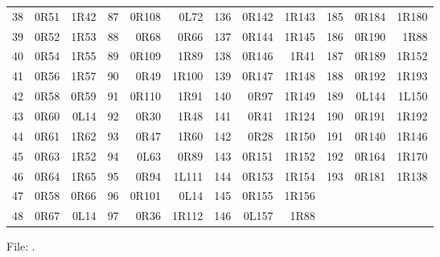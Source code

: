 \begin{center}
\begin{tabular}{rrr@{\hspace{7mm}}rrr@{\hspace{7mm}}rrr@{\hspace{7mm}}rrr}
38 & 0R51 & 1R42 & 87 & 0R108 & 0L72 & 136 & 0R142 & 1R143 & 185 & 0R184 & 1R180 \\
39 & 0R52 & 1R53 & 88 & 0R68 & 0R66 & 137 & 0R144 & 1R145 & 186 & 0R190 & 1R88 \\
40 & 0R54 & 1R55 & 89 & 0R109 & 1R89 & 138 & 0R146 & 1R41 & 187 & 0R189 & 1R152 \\
41 & 0R56 & 1R57 & 90 & 0R49 & 1R100 & 139 & 0R147 & 1R148 & 188 & 0R192 & 1R193 \\
42 & 0R58 & 0R59 & 91 & 0R110 & 1R91 & 140 & 0R97 & 1R149 & 189 & 0L144 & 1L150 \\
43 & 0R60 & 0L14 & 92 & 0R30 & 1R48 & 141 & 0R41 & 1R124 & 190 & 0R191 & 1R192 \\
44 & 0R61 & 1R62 & 93 & 0R47 & 1R60 & 142 & 0R28 & 1R150 & 191 & 0R140 & 1R146 \\
45 & 0R63 & 1R52 & 94 & 0L63 & 0R89 & 143 & 0R151 & 1R152 & 192 & 0R164 & 1R170 \\
46 & 0R64 & 1R65 & 95 & 0R94 & 1L111 & 144 & 0R153 & 1R154 & 193 & 0R181 & 1R138 \\
47 & 0R58 & 0R66 & 96 & 0R101 & 0L14 & 145 & 0R155 & 1R156 &  &  &  \\
48 & 0R67 & 0L14 & 97 & 0R36 & 1R112 & 146 & 0L157 & 1R88 &  &  &  \\
\bottomrule
\end{tabular}
\end{center}
\endgroup
\noindent File: .
\clearpage
